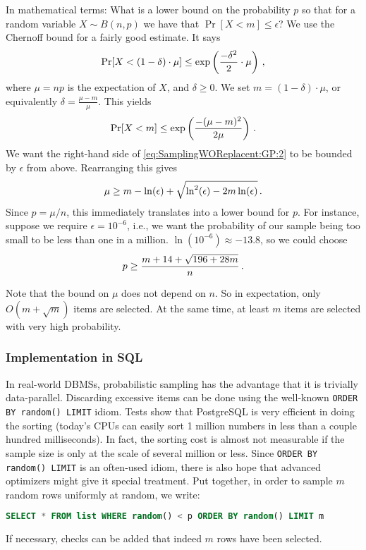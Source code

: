 In mathematical terms: What is a lower bound on the probability $p$ so that for a random variable $X \sim B(n,p)$ we have that $\Pr[X < m] \leq \epsilon$? We use the Chernoff bound for a fairly good estimate. It says
%
\begin{align*}
	\Pr[X < (1 - \delta) \cdot \mu] \leq \exp\left( \frac{-\delta^2}{2} \cdot \mu \right)
	\SiM,
\end{align*}
where $\mu = np$ is the expectation of $X$, and $\delta \geq 0$. We set $m = (1 - \delta) \cdot \mu$, or equivalently $\delta = \frac{\mu - m}{\mu}$.
%
This yields
\begin{align}
	\Pr[X < m] \leq \exp\left( \frac{-(\mu - m)^2}{2 \mu} \right)
	\SiM. \label{eq:SamplingWOReplacent:GP:2}
\end{align}
%
We want the right-hand side of \eqref{eq:SamplingWOReplacent:GP:2} to be bounded by $\epsilon$ from above. Rearranging this gives
\begin{align*}
	\mu \geq m - \ln(\epsilon) + \sqrt{\ln^2(\epsilon) - 2 m \ln(\epsilon)}
	\SiM.
\end{align*}
Since $p = \mu / n$, this immediately translates into a lower bound for $p$. For instance, suppose we require $\epsilon = 10^{-6}$, i.e., we want the probability of our sample being too small to be less than one in a million. $\ln(10^{-6}) \approx -13.8$, so we could choose
\begin{align*}
	p \geq \frac{m + 14 + \sqrt{196 + 28m}}{n}
	\SiM.
\end{align*}

Note that the bound on $\mu$ does not depend on $n$. So in expectation, only $O(m + \sqrt m)$ items are selected. At the same time, at least $m$ items are selected with very high probability.

\subsubsection{Implementation in SQL}

In real-world DBMSs, probabilistic sampling has the advantage that it is trivially data-parallel. Discarding excessive items can be done using the well-known \texttt{ORDER BY random() LIMIT} idiom. Tests show that PostgreSQL is very efficient in doing the sorting (today's CPUs can easily sort 1 million numbers in less than a couple hundred milliseconds). In fact, the sorting cost is almost not measurable if the sample size is only at the scale of several million or less. Since \texttt{ORDER BY random() LIMIT} is an often-used idiom, there is also hope that advanced optimizers might give it special treatment. Put together, in order to sample $m$ random rows uniformly at random, we write:
\begin{lstlisting}[language=SQL]
	SELECT * FROM list WHERE random() < p ORDER BY random() LIMIT m
\end{lstlisting}
If necessary, checks can be added that indeed $m$ rows have been selected.


